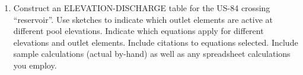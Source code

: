 \documentclass[12pt]{article}
\begin{document}
\begin{enumerate}
\item Construct an ELEVATION-DISCHARGE table for the US-84 crossing “reservoir”. Use sketches to indicate which outlet elements are active at different pool elevations. Indicate which equations apply for different elevations and outlet elements. Include citations to equations selected. Include sample calculations (actual by-hand) as well as any spreadsheet calculations you employ.

\end{enumerate}
\end{document}
